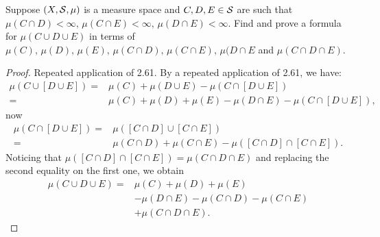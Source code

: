 \begin{exercise}{11}
Suppose $(X, \mathcal{S}, \mu)$ is a measure space and $C, D, E \in \mathcal{S}$ are such that $\mu(C \cap D) < \infty,\, \mu(C \cap E) < \infty,\, \mu(D \cap E) <\infty$.
Find and prove a formula for $\mu(C \cup D \cup E)$ in terms of $\mu(C),\, \mu(D),\, \mu(E),\, \mu(C \cap D),\, \mu(C \cap E),\, \mu(D \cap E$ and $\mu(C \cap D \cap E)$.
\end{exercise}
\begin{proof}
Repeated application of 2.61.
By a repeated application of 2.61, we have:
\begin{align*}
    \mu(C \cup [D \cup E])
    =& \mu(C) + \mu(D \cup E) - \mu(C \cap [D \cup E])\\
    =& \mu(C) + \mu(D) + \mu(E) - \mu(D \cap E) - \mu(C \cap [D \cup E]),
\end{align*}
now
\begin{align*}
    \mu(C \cap [D \cup E])
    =& \mu([C \cap D] \cup [C \cap E])\\
    =& \mu(C \cap D) + \mu(C \cap E) - \mu([C \cap D] \cap [C \cap E]).
\end{align*}
Noticing that $\mu([C \cap D] \cap [C \cap E]) = \mu(C \cap D \cap E)$ and replacing the second equality on the first one, we obtain
\begin{align*}
    \mu(C \cup D \cup E)
    =& \mu(C) + \mu(D) + \mu(E)\\
    &- \mu(D \cap E) - \mu(C \cap D) - \mu(C \cap E)\\
    &+ \mu(C \cap D \cap E).
\end{align*}
\end{proof} 
